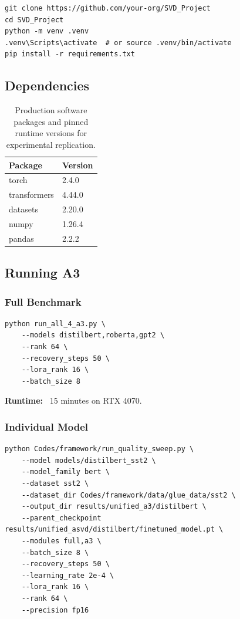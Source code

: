 \begin{lstlisting}
git clone https://github.com/your-org/SVD_Project
cd SVD_Project
python -m venv .venv
.venv\Scripts\activate  # or source .venv/bin/activate
pip install -r requirements.txt
\end{lstlisting}

\subsection{Dependencies}

\begin{table}[H]
\centering
\small
\begin{tabular}{ll}
\toprule
\textbf{Package} & \textbf{Version} \\
\midrule
torch & 2.4.0 \\
transformers & 4.44.0 \\
datasets & 2.20.0 \\
numpy & 1.26.4 \\
pandas & 2.2.2 \\
\bottomrule
\end{tabular}
\caption{Production software packages and pinned runtime versions for experimental replication.}
\label{tab:repro_dependencies}
\end{table}

\subsection{Running A3}

\subsubsection{Full Benchmark}

\begin{lstlisting}
python run_all_4_a3.py \
    --models distilbert,roberta,gpt2 \
    --rank 64 \
    --recovery_steps 50 \
    --lora_rank 16 \
    --batch_size 8
\end{lstlisting}

\textbf{Runtime:} ~15 minutes on RTX 4070.

\subsubsection{Individual Model}

\begin{lstlisting}
python Codes/framework/run_quality_sweep.py \
    --model models/distilbert_sst2 \
    --model_family bert \
    --dataset sst2 \
    --dataset_dir Codes/framework/data/glue_data/sst2 \
    --output_dir results/unified_a3/distilbert \
    --parent_checkpoint results/unified_asvd/distilbert/finetuned_model.pt \
    --modules full,a3 \
    --batch_size 8 \
    --recovery_steps 50 \
    --learning_rate 2e-4 \
    --lora_rank 16 \
    --rank 64 \
    --precision fp16
\end{lstlisting}

